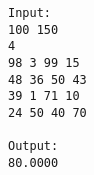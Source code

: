 \begin{verbatim}
Input:
100 150
4
98 3 99 15
48 36 50 43
39 1 71 10
24 50 40 70

Output:
80.0000
\end{verbatim}